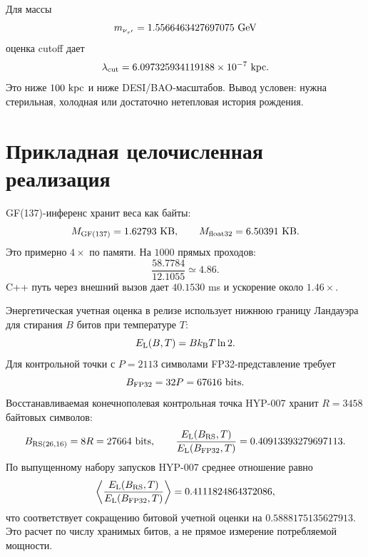 \documentclass[11pt]{article}
\begin{document}
Для массы
\begin{equation}
    m_{\nu_{\tau'}}=1.5566463427697075~{\rm GeV}
\end{equation}
оценка cutoff дает
\begin{equation}
    \lambda_{\rm cut}
    =
    6.097325934119188\times10^{-7}~{\rm kpc}.
\end{equation}
Это ниже $100~{\rm kpc}$ и ниже DESI/BAO-масштабов.  Вывод условен: нужна
стерильная, холодная или достаточно нетепловая история рождения.

\section{Прикладная целочисленная реализация}

GF(137)-инференс хранит веса как байты:
\begin{equation}
    M_{\rm GF(137)}=1.62793~{\rm KB},
    \qquad
    M_{\rm float32}=6.50391~{\rm KB}.
\end{equation}
Это примерно $4\times$ по памяти.  На $1000$ прямых проходов:
\begin{equation}
    \frac{58.7784}{12.1055}\simeq4.86.
\end{equation}
C++ путь через внешний вызов дает $40.1530$ ms и ускорение около $1.46\times$.

Энергетическая учетная оценка в релизе использует нижнюю границу Ландауэра для
стирания $B$ битов при температуре $T$:
\begin{equation}
    E_{\rm L}(B,T)=B k_{\rm B}T\ln2.
\end{equation}
Для контрольной точки с $P=2113$ символами FP32-представление требует
\begin{equation}
    B_{\rm FP32}=32P=67616~{\rm bits}.
\end{equation}
Восстанавливаемая конечнополевая контрольная точка HYP-007 хранит $R=3458$
байтовых символов:
\begin{equation}
    B_{\rm RS(26,16)}=8R=27664~{\rm bits},
    \qquad
    \frac{E_{\rm L}(B_{\rm RS},T)}{E_{\rm L}(B_{\rm FP32},T)}
    =
    0.40913393279697113.
\end{equation}
По выпущенному набору запусков HYP-007 среднее отношение равно
\begin{equation}
    \left\langle
    \frac{E_{\rm L}(B_{\rm RS},T)}{E_{\rm L}(B_{\rm FP32},T)}
    \right\rangle
    =
    0.4111824864372086,
\end{equation}
что соответствует сокращению битовой учетной оценки на
$0.5888175135627913$.  Это расчет по числу хранимых битов, а не прямое
измерение потребляемой мощности.
\end{document}
